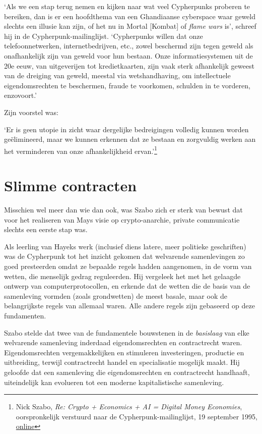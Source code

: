 \documentclass[
  a5paper,
  smalldemyvopaper,11pt,twoside,onecolumn,openright,extrafontsizes,
hidelinks]{memoir}
\renewenvironment{quote}%
               {\list{}{\rightmargin=.3cm\leftmargin=.3cm}%
                \itshape \item[]}%
               {\endlist}
\begin{document}
`Als we een stap terug nemen en kijken naar wat veel Cypherpunks
proberen te bereiken, dan is er een hoofdthema van een Ghandiaanse
cyberspace waar geweld slechts een illusie kan zijn, of het nu in Mortal
{[}Kombat{]} of \emph{flame wars} is', schreef hij in de
Cypherpunk-mailinglijst. `Cypherpunks willen dat onze telefoonnetwerken,
internetbedrijven, etc., zowel beschermd zijn tegen geweld als
onafhankelijk zijn van geweld voor hun bestaan. Onze informatiesystemen
uit de 20e eeuw, van uitgeverijen tot kredietkaarten, zijn vaak sterk
afhankelijk geweest van de dreiging van geweld, meestal via
wetshandhaving, om intellectuele eigendomsrechten te beschermen, fraude
te voorkomen, schulden in te vorderen, enzovoort.'

Zijn voorstel was:

\begin{quote}
`Er is geen utopie in zicht waar dergelijke bedreigingen volledig kunnen
worden geëlimineerd, maar we kunnen erkennen dat ze bestaan en
zorgvuldig werken aan het verminderen van onze afhankelijkheid
ervan.'\footnote{Nick Szabo, \emph{Re: Crypto + Economics + AI = Digital
  Money Economies}, oorspronkelijk verstuurd naar de
  Cypherpunk-mailinglijst, 19 september 1995,
  \href{https://cypherpunks.venona.com/date/1995/09/msg01303.html}{online}}
\end{quote}

\section{Slimme contracten}\label{slimme-contracten}

Misschien wel meer dan wie dan ook, was Szabo zich er sterk van bewust
dat voor het realiseren van Mays visie op crypto-anarchie, private
communicatie slechts een eerste stap was.

Als leerling van Hayeks werk (inclusief diens latere, meer politieke
geschriften) was de Cypherpunk tot het inzicht gekomen dat welvarende
samenlevingen zo goed presteerden omdat ze bepaalde regels hadden
aangenomen, in de vorm van wetten, die menselijk gedrag reguleerden. Hij
vergeleek het met het gelaagde ontwerp van computerprotocollen, en
erkende dat de wetten die de basis van de samenleving vormden (zoals
grondwetten) de meest basale, maar ook de belangrijkste regels van
allemaal waren. Alle andere regels zijn gebaseerd op deze fundamenten.

Szabo stelde dat twee van de fundamentele bouwstenen in de
\emph{basislaag} van elke welvarende samenleving inderdaad
eigendomsrechten en contractrecht waren. Eigendomsrechten
vergemakkelijken en stimuleren investeringen, productie en uitbreiding,
terwijl contractrecht handel en specialisatie mogelijk maakt. Hij
geloofde dat een samenleving die eigendomsrechten en contractrecht
handhaaft, uiteindelijk kan evolueren tot een moderne kapitalistische
samenleving.
\end{document}
